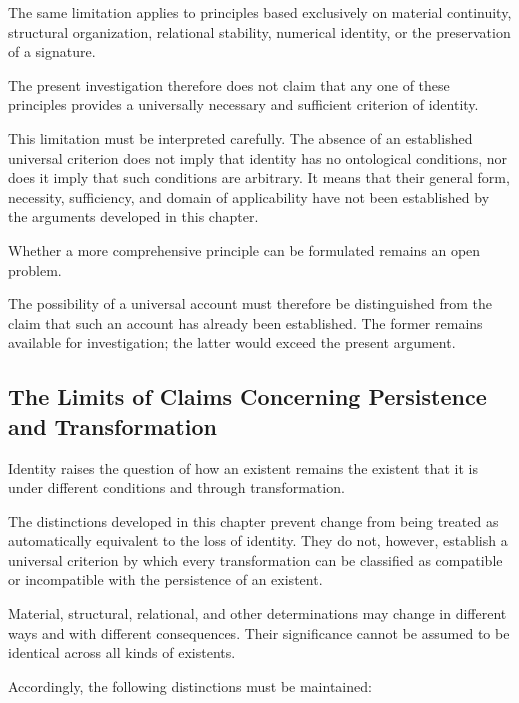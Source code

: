 The same limitation applies to principles based exclusively
on material continuity, structural organization, relational
stability, numerical identity, or the preservation of
a signature.

The present investigation therefore does not claim that
any one of these principles provides a universally
necessary and sufficient criterion of identity.

This limitation must be interpreted carefully. The absence
of an established universal criterion does not imply that
identity has no ontological conditions, nor does it imply
that such conditions are arbitrary. It means that their
general form, necessity, sufficiency, and domain of
applicability have not been established by the arguments
developed in this chapter.

Whether a more comprehensive principle can be formulated
remains an open problem.

The possibility of a universal account must therefore
be distinguished from the claim that such an account has
already been established. The former remains available
for investigation; the latter would exceed the present
argument.

\subsection{The Limits of Claims Concerning Persistence and Transformation}

Identity raises the question of how an existent remains
the existent that it is under different conditions and
through transformation.

The distinctions developed in this chapter prevent change
from being treated as automatically equivalent to the
loss of identity. They do not, however, establish a
universal criterion by which every transformation can
be classified as compatible or incompatible with the
persistence of an existent.

Material, structural, relational, and other determinations
may change in different ways and with different consequences.
Their significance cannot be assumed to be identical
across all kinds of existents.

Accordingly, the following distinctions must be maintained:

